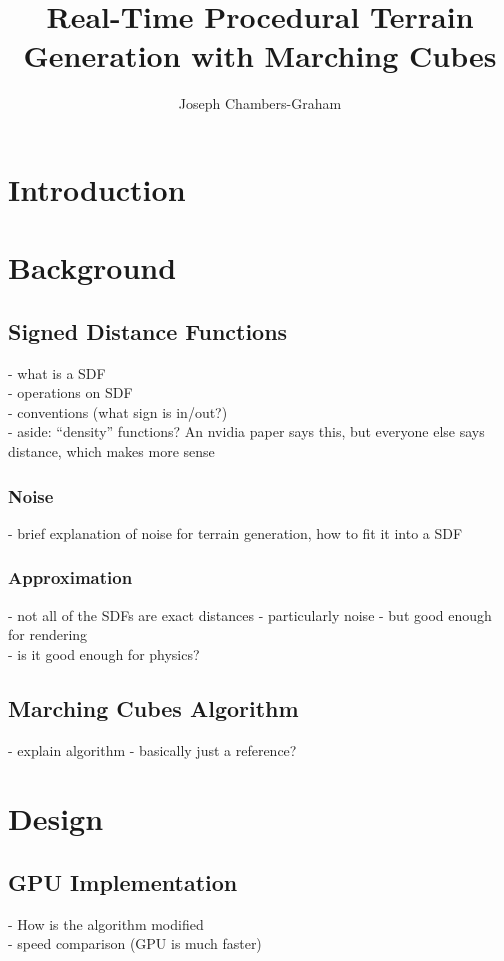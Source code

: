\documentclass{article}
\title{Real-Time Procedural Terrain Generation with Marching Cubes}
\author{Joseph Chambers-Graham}
\date{}
\begin{document}
\maketitle
\newpage

\tableofcontents
\section{Introduction}

\section{Background}
\subsection{Signed Distance Functions}
- what is a SDF\\
- operations on SDF\\
- conventions (what sign is in/out?)\\
- aside: ``density'' functions? An nvidia paper says this, but everyone else says distance, which makes more sense\\

\subsubsection{Noise}
- brief explanation of noise for terrain generation, how to fit it into a SDF
\subsubsection{Approximation}
- not all of the SDFs are exact distances - particularly noise - but good enough for rendering\\
- is it good enough for physics?
\subsection{Marching Cubes Algorithm}
- explain algorithm - basically just a reference?

\section{Design}
\subsection{GPU Implementation}
- How is the algorithm modified\\
- speed comparison (GPU is much faster)
\end{document}

